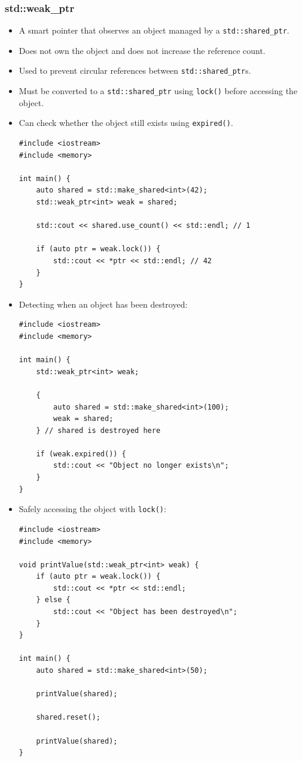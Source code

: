 \documentclass[10pt]{article}
\begin{document}
\subsubsection{std::weak\_ptr}
\begin{itemize}
    \item A smart pointer that observes an object managed by a \texttt{std::shared\_ptr}.
    \item Does not own the object and does not increase the reference count.
    \item Used to prevent circular references between \texttt{std::shared\_ptr}s.
    \item Must be converted to a \texttt{std::shared\_ptr} using \texttt{lock()} before accessing the object.
    \item Can check whether the object still exists using \texttt{expired()}.

    \begin{verbatim}
#include <iostream>
#include <memory>

int main() {
    auto shared = std::make_shared<int>(42);
    std::weak_ptr<int> weak = shared;

    std::cout << shared.use_count() << std::endl; // 1

    if (auto ptr = weak.lock()) {
        std::cout << *ptr << std::endl; // 42
    }
}
    \end{verbatim}

    \item Detecting when an object has been destroyed:

    \begin{verbatim}
#include <iostream>
#include <memory>

int main() {
    std::weak_ptr<int> weak;

    {
        auto shared = std::make_shared<int>(100);
        weak = shared;
    } // shared is destroyed here

    if (weak.expired()) {
        std::cout << "Object no longer exists\n";
    }
}
    \end{verbatim}

    \item Safely accessing the object with \texttt{lock()}:

\begin{verbatim}
#include <iostream>
#include <memory>

void printValue(std::weak_ptr<int> weak) {
    if (auto ptr = weak.lock()) {
        std::cout << *ptr << std::endl;
    } else {
        std::cout << "Object has been destroyed\n";
    }
}

int main() {
    auto shared = std::make_shared<int>(50);

    printValue(shared);

    shared.reset();

    printValue(shared);
}
\end{verbatim}

\end{itemize}
\end{document}
